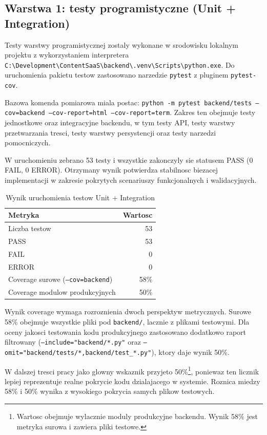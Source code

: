 \subsection{Warstwa 1: testy programistyczne (Unit + Integration)}

Testy warstwy programistycznej zostaly wykonane w srodowisku lokalnym projektu z wykorzystaniem interpretera \texttt{C:\textbackslash Development\textbackslash ContentSaaS\textbackslash backend\textbackslash .venv\textbackslash Scripts\textbackslash python.exe}. Do uruchomienia pakietu testow zastosowano narzedzie \texttt{pytest} z pluginem \texttt{pytest-cov}.

Bazowa komenda pomiarowa miala postac: \texttt{python -m pytest backend/tests --cov=backend --cov-report=html --cov-report=term}. Zakres ten obejmuje testy jednostkowe oraz integracyjne backendu, w tym testy API, testy warstwy przetwarzania tresci, testy warstwy persystencji oraz testy narzedzi pomocniczych.

W uruchomieniu zebrano 53 testy i wszystkie zakonczyly sie statusem PASS (0 FAIL, 0 ERROR). Otrzymany wynik potwierdza stabilnosc biezacej implementacji w zakresie pokrytych scenariuszy funkcjonalnych i walidacyjnych.

\begin{table}[htbp]
\centering
\caption{Wynik uruchomienia testow Unit + Integration}
\label{tab:unit_integration_summary}
\begin{tabular}{lr}
\hline
Metryka & Wartosc \\
\hline
Liczba testow & 53 \\
PASS & 53 \\
FAIL & 0 \\
ERROR & 0 \\
Coverage surowe (\texttt{--cov=backend}) & 58\% \\
Coverage modulow produkcyjnych & 50\% \\
\hline
\end{tabular}
\end{table}

Wynik coverage wymaga rozroznienia dwoch perspektyw metrycznych. Surowe 58\% obejmuje wszystkie pliki pod \texttt{backend/}, lacznie z plikami testowymi. Dla oceny jakosci testowania kodu produkcyjnego zastosowano dodatkowo raport filtrowany (\texttt{--include="backend/*.py"} oraz \texttt{--omit="backend/tests/*,backend/test\_*.py"}), ktory daje wynik 50\%.

W dalszej tresci pracy jako glowny wskaznik przyjeto 50\%\footnote{Wartosc obejmuje wylacznie moduly produkcyjne backendu. Wynik 58\% jest metryka surowa i zawiera pliki testowe.}, poniewaz ten licznik lepiej reprezentuje realne pokrycie kodu dzialajacego w systemie. Roznica miedzy 58\% i 50\% wynika z wysokiego pokrycia samych plikow testowych.

